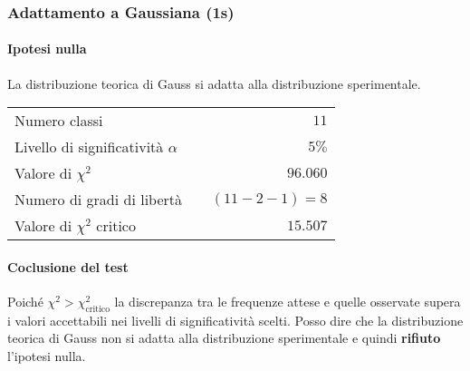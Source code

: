 \documentclass{article}
\begin{document}
\subsubsection{Adattamento a Gaussiana (1s)}
\paragraph{Ipotesi nulla} La distribuzione teorica di Gauss si adatta alla distribuzione sperimentale.

\vspace{0.2cm}
\begin{center}
\begin{tabular}{lr}
	Numero classi & $11$ \\
	Livello di significatività $\alpha$		& $ \quad 5\%$  \\
	Valore di $\chi ^2$             	& $\quad 96.060$       \\
	Numero di gradi di libertà      	& $\quad (11-2-1) = 8$         \\   
	Valore di $\chi ^2$ critico     	& $\quad 15.507$
\end{tabular}
\end{center}

\paragraph{Coclusione del test} Poiché $\chi^2 > \chi^2_{\text{critico}}$ la discrepanza tra le frequenze attese e quelle osservate supera i valori accettabili nei livelli di significatività scelti. Posso dire che la distribuzione teorica di Gauss non si adatta alla distribuzione sperimentale e quindi \textbf{rifiuto} l'ipotesi nulla.

\begin{center}
\end{center}
\end{document}
